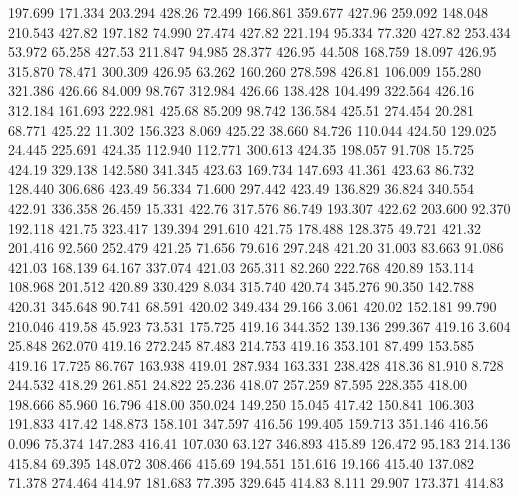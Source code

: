  197.699  171.334  203.294       428.26
  72.499  166.861  359.677       427.96
 259.092  148.048  210.543       427.82
 197.182   74.990   27.474       427.82
 221.194   95.334   77.320       427.82
 253.434   53.972   65.258       427.53
 211.847   94.985   28.377       426.95
  44.508  168.759   18.097       426.95
 315.870   78.471  300.309       426.95
  63.262  160.260  278.598       426.81
 106.009  155.280  321.386       426.66
  84.009   98.767  312.984       426.66
 138.428  104.499  322.564       426.16
 312.184  161.693  222.981       425.68
  85.209   98.742  136.584       425.51
 274.454   20.281   68.771       425.22
  11.302  156.323    8.069       425.22
  38.660   84.726  110.044       424.50
 129.025   24.445  225.691       424.35
 112.940  112.771  300.613       424.35
 198.057   91.708   15.725       424.19
 329.138  142.580  341.345       423.63
 169.734  147.693   41.361       423.63
  86.732  128.440  306.686       423.49
  56.334   71.600  297.442       423.49
 136.829   36.824  340.554       422.91
 336.358   26.459   15.331       422.76
 317.576   86.749  193.307       422.62
 203.600   92.370  192.118       421.75
 323.417  139.394  291.610       421.75
 178.488  128.375   49.721       421.32
 201.416   92.560  252.479       421.25
  71.656   79.616  297.248       421.20
  31.003   83.663   91.086       421.03
 168.139   64.167  337.074       421.03
 265.311   82.260  222.768       420.89
 153.114  108.968  201.512       420.89
 330.429    8.034  315.740       420.74
 345.276   90.350  142.788       420.31
 345.648   90.741   68.591       420.02
 349.434   29.166    3.061       420.02
 152.181   99.790  210.046       419.58
  45.923   73.531  175.725       419.16
 344.352  139.136  299.367       419.16
   3.604   25.848  262.070       419.16
 272.245   87.483  214.753       419.16
 353.101   87.499  153.585       419.16
  17.725   86.767  163.938       419.01
 287.934  163.331  238.428       418.36
  81.910    8.728  244.532       418.29
 261.851   24.822   25.236       418.07
 257.259   87.595  228.355       418.00
 198.666   85.960   16.796       418.00
 350.024  149.250   15.045       417.42
 150.841  106.303  191.833       417.42
 148.873  158.101  347.597       416.56
 199.405  159.713  351.146       416.56
   0.096   75.374  147.283       416.41
 107.030   63.127  346.893       415.89
 126.472   95.183  214.136       415.84
  69.395  148.072  308.466       415.69
 194.551  151.616   19.166       415.40
 137.082   71.378  274.464       414.97
 181.683   77.395  329.645       414.83
   8.111   29.907  173.371       414.83
